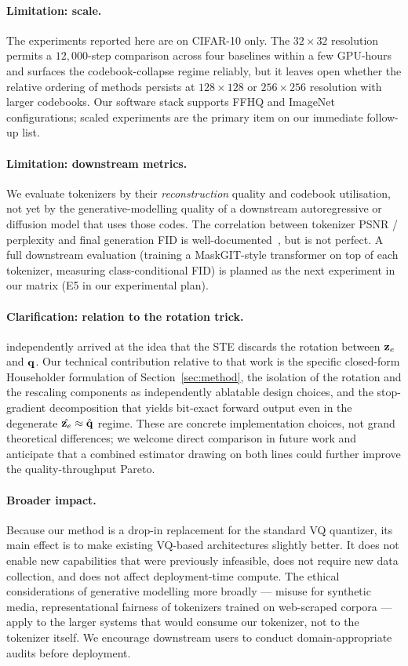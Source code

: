 \paragraph{Limitation: scale.}
The experiments reported here are on CIFAR-10 only. The $32 \times
32$ resolution permits a $12{,}000$-step comparison across four
baselines within a few GPU-hours and surfaces the codebook-collapse
regime reliably, but it leaves open whether the relative ordering of
methods persists at $128{\times}128$ or $256{\times}256$ resolution
with larger codebooks. Our software stack supports FFHQ and ImageNet
configurations; scaled experiments are the primary item on our
immediate follow-up list.

\paragraph{Limitation: downstream metrics.}
We evaluate tokenizers by their \emph{reconstruction} quality and
codebook utilisation, not yet by the generative-modelling quality of
a downstream autoregressive or diffusion model that uses those
codes. The correlation between tokenizer PSNR / perplexity and
final generation FID is well-documented~\citep{yu2022vitvqgan,
yu2023magvit2,yu2024titok}, but is not perfect. A full downstream
evaluation (training a MaskGIT-style transformer on top of each
tokenizer, measuring class-conditional FID) is planned as the next
experiment in our matrix (E5 in our experimental plan).

\paragraph{Clarification: relation to the rotation trick.}
\citet{fifty2024rotation} independently arrived at the idea that the
STE discards the rotation between $\mathbf{z}_e$ and $\mathbf{q}$. Our technical
contribution relative to that work is the specific closed-form
Householder formulation of Section~\ref{sec:method}, the isolation
of the rotation and the rescaling components as independently
ablatable design choices, and the stop-gradient decomposition that
yields bit-exact forward output even in the degenerate
$\hat{\mathbf{z}_e} \approx \hat{\mathbf{q}}$ regime. These are concrete
implementation choices, not grand theoretical differences; we
welcome direct comparison in future work and anticipate that a
combined estimator drawing on both lines could further improve the
quality-throughput Pareto.

\paragraph{Broader impact.}
Because our method is a drop-in replacement for the standard VQ
quantizer, its main effect is to make existing VQ-based
architectures slightly better. It does not enable new capabilities
that were previously infeasible, does not require new data
collection, and does not affect deployment-time compute.  The
ethical considerations of generative modelling more broadly ---
misuse for synthetic media, representational fairness of
tokenizers trained on web-scraped corpora --- apply to the larger
systems that would consume our tokenizer, not to the tokenizer
itself. We encourage downstream users to conduct domain-appropriate
audits before deployment.
